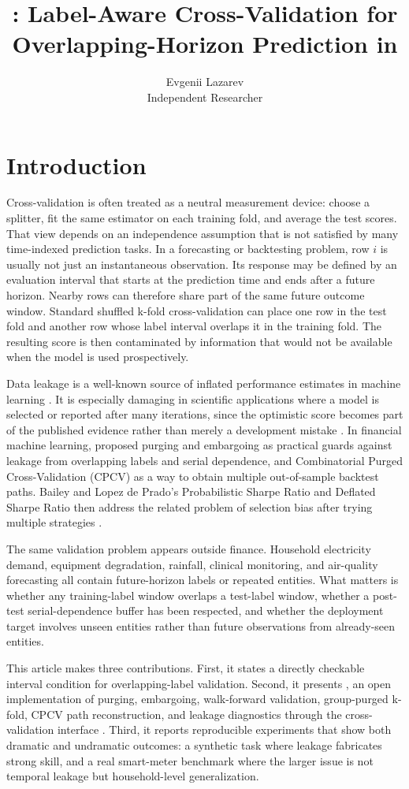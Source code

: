 \documentclass[article]{jdssv}
\author{Evgenii Lazarev\\Independent Researcher}
\title{\pcv: Label-Aware Cross-Validation for Overlapping-Horizon Prediction in \proglang{Python}}
\newcommand{\pcv}{\pkg{purgedcv}}
\begin{document}
\section{Introduction}

Cross-validation is often treated as a neutral measurement device: choose a
splitter, fit the same estimator on each training fold, and average the test
scores. That view depends on an independence assumption that is not satisfied by
many time-indexed prediction tasks. In a forecasting or backtesting problem, row
$i$ is usually not just an instantaneous observation. Its response may be
defined by an evaluation interval that starts at the prediction time and ends
after a future horizon. Nearby rows can therefore share part of the same future
outcome window. Standard shuffled k-fold cross-validation can place one row in
the test fold and another row whose label interval overlaps it in the training
fold. The resulting score is then contaminated by information that would not be
available when the model is used prospectively.

Data leakage is a well-known source of inflated performance estimates in
machine learning \citep{kaufman2012}. It is especially damaging in scientific
applications where a model is selected or reported after many iterations, since
the optimistic score becomes part of the published evidence rather than merely a
development mistake \citep{mcdermott2021}. In financial machine learning,
\citet{lopezdeprado2018afml} proposed purging and embargoing as practical
guards against leakage from overlapping labels and serial dependence, and
Combinatorial Purged Cross-Validation (CPCV) as a way to obtain multiple
out-of-sample backtest paths. Bailey and Lopez de Prado's Probabilistic Sharpe
Ratio and Deflated Sharpe Ratio then address the related problem of selection
bias after trying multiple strategies \citep{bailey2012psr,bailey2014dsr}.

The same validation problem appears outside finance. Household electricity
demand, equipment degradation, rainfall, clinical monitoring, and air-quality
forecasting all contain future-horizon labels or repeated entities. What matters
is whether any training-label window overlaps a test-label window, whether a
post-test serial-dependence buffer has been respected, and whether the
deployment target involves unseen entities rather than future observations from
already-seen entities.

This article makes three contributions. First, it states a directly checkable
interval condition for overlapping-label validation. Second, it presents \pcv,
an open  implementation of purging, embargoing, walk-forward
validation, group-purged k-fold, CPCV path reconstruction, and leakage
diagnostics through the  cross-validation interface
\citep{pedregosa2011sklearn,purgedcv2026}. Third, it reports reproducible
experiments that show both dramatic and undramatic outcomes: a synthetic task
where leakage fabricates strong skill, and a real smart-meter benchmark where
the larger issue is not temporal leakage but household-level generalization.
\end{document}
